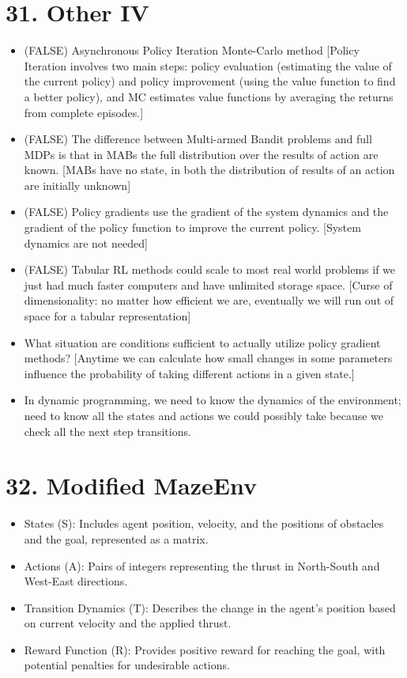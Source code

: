 \documentclass[letterpaper,10pt]{article}
\begin{document}
\begin{multicols}{2}
\section*{31. Other IV}
\begin{itemize}
    \item (FALSE) Asynchronous Policy Iteration Monte-Carlo method [Policy Iteration involves two main steps: policy evaluation (estimating the value of the current policy) and policy improvement (using the value function to find a better policy), and MC estimates value functions by averaging the returns from complete episodes.]
    \item (FALSE) The difference between Multi-armed Bandit problems and full MDPs is that in MABs the full distribution over the results of action are known. [MABs have no state, in both the distribution of results of an action are initially unknown]
    \item (FALSE) Policy gradients use the gradient of the system dynamics and the gradient of the policy function to improve the current policy. [System dynamics are not needed]
    \item (FALSE) Tabular RL methods could scale to most real world problems if we just had much faster computers and have unlimited storage space. [Curse of dimensionality: no matter how efficient we are, eventually we will run out of space for a tabular representation]
    \item What situation are conditions sufficient to actually utilize policy gradient methods? [Anytime we can calculate how small changes in some parameters influence the probability of taking different actions in a given state.]
    \item In dynamic programming, we need to know the dynamics of the environment; need to know all the states and actions we could possibly take because we check all the next step transitions.
\end{itemize}

\section*{32. Modified MazeEnv}
\begin{itemize}
    \item States (S): Includes agent position, velocity, and the positions of obstacles and the goal, represented as a matrix.
    \item Actions (A): Pairs of integers representing the thrust in North-South and West-East directions.
    \item Transition Dynamics (T): Describes the change in the agent's position based on current velocity and the applied thrust.
    \item Reward Function (R): Provides positive reward for reaching the goal, with potential penalties for undesirable actions.
\end{itemize}

\end{multicols}
\end{document}
